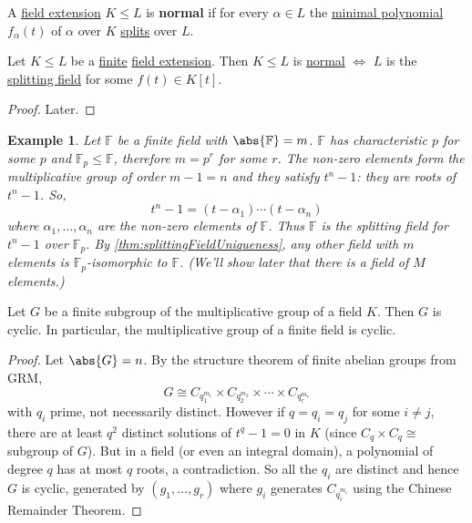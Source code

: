 \documentclass{article}
\newtheorem{nexample}[nthm]{Example}
\newcommand{\F}{\mathbb{F}}
\begin{document}
\begin{ndef}
    A \hyperlink{def:fieldExt}{field extension} $K \leq L$ is \textbf{normal} if for every $\alpha \in L$ the \hyperlink{def:minimalPoly}{minimal polynomial} $f_\alpha(t)$ of $\alpha$ over $K$ \hyperlink{def:splitting}{splits} over $L$.
\end{ndef}

\begin{nthm}
    Let $K \leq L$ be a \hyperlink{def:degreeOfFieldExt}{finite} \hyperlink{def:fieldExt}{field extension}. Then $K \leq L$ is \hyperlink{def:normal}{normal} $\iff$ $L$ is the \hyperlink{def:splitting}{splitting field} for some $f(t) \in K[t]$.
\end{nthm}

\begin{proof}
    Later.
\end{proof}

\begin{nexample}
    Let $\F$ be a finite field with $\abs{\mathbb{F}} = m$. $\F$ has characteristic $p$ for some $p$ and $\F_p \leq \F$, therefore $m = p^r$ for some $r$.
    The non-zero elements form the multiplicative group of order $m-1=n$ and they satisfy $t^n - 1$: they are roots of $t^n - 1$. So,
    \begin{equation*}
        t^n - 1 = (t - \alpha_1) \dotsm (t-\alpha_n)
    \end{equation*}
    where $\alpha_1, \dotsc, \alpha_n$  are the non-zero elements of $\F$. Thus $\F$ is the splitting field for $t^n - 1$ over $\F_p$.
    By \cref{thm:splittingFieldUniqueness}, any other field with $m$ elements is $\F_p$-isomorphic to $\F$.  (We'll show later that there is a field of $M$ elements.)
\end{nexample}

\begin{nthm}
    Let $G$ be a finite subgroup of the multiplicative group of a field $K$. Then $G$ is cyclic. In particular, the multiplicative group of a finite field is cyclic.
\end{nthm}

\begin{proof}
    Let $\abs{G} = n$. By the structure theorem of finite abelian groups from GRM,
    \begin{equation*}
        G \cong C_{q_1^{m_1}} \times C_{q_2^{m_2}} \times \dotsm \times C_{q_r^{m_r}}
    \end{equation*}
    with $q_i$ prime, not necessarily distinct.
    However if $q = q_i = q_j$ for some $i \neq j$, there are at least $q^2$ distinct solutions of $t^q - 1 = 0$ in $K$ (since $C_q \times C_q \cong$ subgroup of $G$).
    But in a field (or even an integral domain), a polynomial of degree $q$ has at most $q$ roots, a contradiction.
    So all the $q_i$ are distinct and hence $G$ is cyclic, generated by $(g_1, \dotsc, g_r)$ where $g_i$ generates $C_{q_i^{m_i}}$ using the Chinese Remainder Theorem.
\end{proof}
\end{document}
